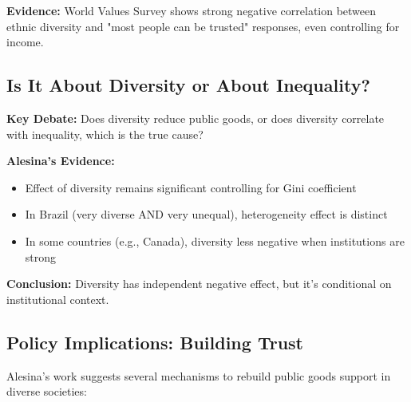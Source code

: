 \textbf{Evidence:} World Values Survey shows strong negative correlation between ethnic diversity and "most people can be trusted" responses, even controlling for income.

\subsection{Is It About Diversity or About Inequality?}

\textbf{Key Debate:} Does diversity reduce public goods, or does diversity correlate with inequality, which is the true cause?

\textbf{Alesina's Evidence:}
\begin{itemize}
\item Effect of diversity remains significant controlling for Gini coefficient
\item In Brazil (very diverse AND very unequal), heterogeneity effect is distinct
\item In some countries (e.g., Canada), diversity less negative when institutions are strong
\end{itemize}

\textbf{Conclusion:} Diversity has independent negative effect, but it's conditional on institutional context.

\subsection{Policy Implications: Building Trust}

Alesina's work suggests several mechanisms to rebuild public goods support in diverse societies:

